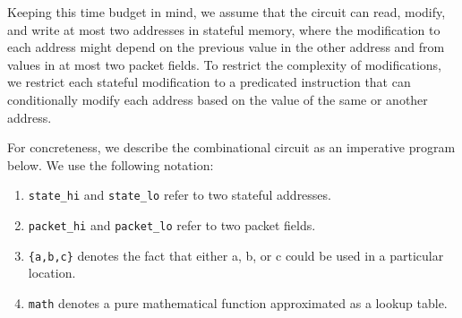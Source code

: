 Keeping this time budget in mind, we assume that the circuit can read, modify,
and write at most two addresses in stateful memory, where the modification to
each address might depend on the previous value in the other address and from
values in at most two packet fields. To restrict the complexity of
modifications, we restrict each stateful modification to a predicated
instruction that can conditionally modify each address based on the value of
the same or another address.

For concreteness, we describe the combinational circuit as an imperative
program below. We use the following notation:
\begin{enumerate}
\item \texttt{state\_hi} and \texttt{state\_lo} refer to two stateful addresses.
\item \texttt{packet\_hi} and \texttt{packet\_lo} refer to two packet fields.
\item \texttt{\{a,b,c\}} denotes the fact that either a, b, or c could be used
in a particular location.
\item \texttt{math} denotes a pure mathematical function approximated as a lookup
  table.
\end{enumerate}

